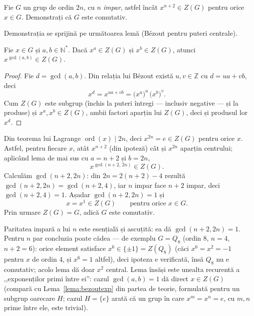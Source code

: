\begin{problema}
Fie $G$ un grup de ordin $2n$, cu $n$ \emph{impar}, astfel încât
$x^{n+2}\in Z(G)$ pentru orice $x\in G$. Demonstrați că $G$ este
comutativ.
\end{problema}

Demonstrația se sprijină pe următoarea lemă (Bézout pentru
puteri centrale).

\begin{lemat}\label{lema:bezoutZ}
Fie $x\in G$ și $a,b\in\mathbb{N}^{*}$. Dacă $x^{a}\in Z(G)$ și
$x^{b}\in Z(G)$, atunci $x^{\gcd(a,b)}\in Z(G)$.
\end{lemat}

\begin{proof}
Fie $d=\gcd(a,b)$. Din relația lui Bézout există $u,v\in\mathbb{Z}$
cu $d=ua+vb$, deci
\[
  x^{d}=x^{ua+vb}=\bigl(x^{a}\bigr)^{u}\,\bigl(x^{b}\bigr)^{v}.
\]
Cum $Z(G)$ este subgrup (închis la puteri întregi --- inclusiv
negative --- și la produse) și $x^{a},x^{b}\in Z(G)$, ambii factori
aparțin lui $Z(G)$, deci și produsul lor $x^{d}$.
\end{proof}

\begin{solutie}
Din teorema lui Lagrange $\operatorname{ord}(x)\mid 2n$, deci $x^{2n}=e\in Z(G)$
pentru orice $x$. Astfel, pentru fiecare $x$, atât $x^{n+2}$ (din
ipoteză) cât și $x^{2n}$ aparțin centrului; aplicând lema de mai sus cu $a=n+2$ și $b=2n$,
\[
  x^{\gcd(n+2,\,2n)}\in Z(G).
\]
Calculăm $\gcd(n+2,2n)$: din $2n=2(n+2)-4$ rezultă
$\gcd(n+2,2n)=\gcd(n+2,4)$, iar $n$ impar face $n+2$ impar, deci
$\gcd(n+2,4)=1$. Așadar $\gcd(n+2,2n)=1$ și
\[
  x=x^{1}\in Z(G)\qquad\text{pentru orice }x\in G.
\]
Prin urmare $Z(G)=G$, adică $G$ este comutativ.
\end{solutie}

\begin{obs}
Paritatea impară a lui $n$ este esențială și ascuțită:
ea dă $\gcd(n+2,2n)=1$. Pentru $n$ par concluzia poate cădea --- de
exemplu $G=Q_{8}$ (ordin $8$, $n=4$, $n+2=6$): orice element satisface
$x^{6}\in\{\pm1\}=Z(Q_{8})$ (căci $x^{6}=x^{2}=-1$ pentru $x$ de ordin
$4$, și $x^{6}=1$ altfel), deci ipoteza e verificată, însă
$Q_{8}$ nu e comutativ; acolo lema dă doar $x^{2}$ central. Lema
însăși este unealta recurentă a ,,exponenților primi
între ei'': cazul $\gcd(a,b)=1$ dă direct $x\in Z(G)$ (compară
cu Lema~\ref{lema:bezoutexp} din partea de teorie, formulată pentru un
subgrup oarecare $H$; cazul $H=\{e\}$ arată că un grup în care
$x^{m}=x^{n}=e$, cu $m,n$ prime între ele, este trivial).
\end{obs}

